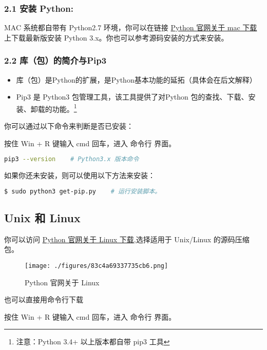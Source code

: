 \subsubsection{2.1 安装 Python:}
MAC 系统都自带有 Python2.7 环境，你可以在链接 \href{https://www.python.org/downloads/mac-osx/}{Python 官网关于 mac 下载} 上下载最新版安装 Python 3.x。你也可以参考源码安装的方式来安装。

\subsubsection{2.2 库（包）的简介与Pip3}

\begin{itemize}
\item 库（包）是Python的扩展，是Python基本功能的延拓（具体会在后文解释）
\item Pip3 是 Python3 包管理工具，该工具提供了对Python 包的查找、下载、安装、卸载的功能。\footnote{注意：Python 3.4+ 以上版本都自带 pip3 工具}
\end{itemize}

你可以通过以下命令来判断是否已安装：

按住 Win + R 键输入 cmd 回车，进入 命令行 界面。


\begin{lstlisting}[language=bash]
pip3 --version    # Python3.x 版本命令
\end{lstlisting}

如果你还未安装，则可以使用以下方法来安装：

\begin{lstlisting}[language=bash]
$ sudo python3 get-pip.py    # 运行安装脚本。
\end{lstlisting}

\subsection{Unix 和 Linux}\label{sub_Pyc1_3} 

你可以访问 \href{https://www.python.org/downloads/source/}{Python 官网关于 Linux 下载},选择适用于 Unix/Linux 的源码压缩包。
\begin{figure}[ht]
\centering
\texttt{[image: ./figures/83c4a69337735cb6.png]}
\caption{Python 官网关于 Linux} \label{fig_Python_2}
\end{figure}

也可以直接用命令行下载

按住 Win + R 键输入 cmd 回车，进入 命令行 界面。

